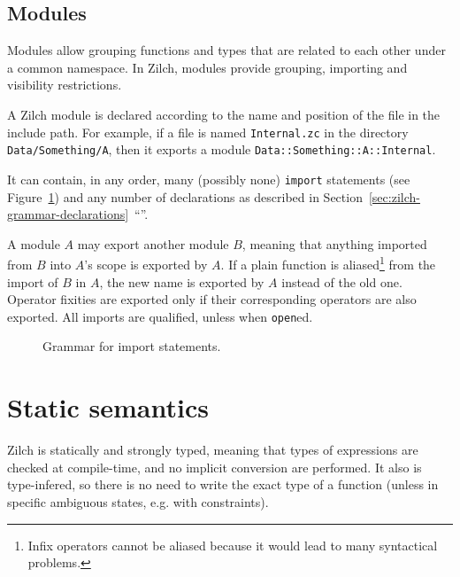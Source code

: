 \section{Modules}\label{sec:zilch-grammar-modules}

Modules allow grouping functions and types that are related to each other under a common namespace.
In Zilch, modules provide grouping, importing and visibility restrictions.

A Zilch module is declared according to the name and position of the file in the include path.
For example, if a file is named \verb|Internal.zc| in the directory \verb|Data/Something/A|, then it exports a module \verb|Data::Something::A::Internal|.

It can contain, in any order, many (possibly none) \texttt{import} statements (see Figure~\ref{fig:zilch-grammar-modules-importgrammar}) and any number of declarations as described in Section~\ref{sec:zilch-grammar-declarations}~``''.

A module $A$ may export another module $B$, meaning that anything imported from $B$ into $A$'s scope is exported by $A$.
If a plain function is aliased\footnote{Infix operators cannot be aliased because it would lead to many syntactical problems.} from the import of $B$ in $A$, the new name is exported by $A$ instead of the old one.
Operator fixities are exported only if their corresponding operators are also exported.
All imports are qualified, unless when \verb|open|ed.

\begin{figure}[H]
	\centering


	\caption{Grammar for import statements.}
	\label{fig:zilch-grammar-modules-importgrammar}
\end{figure}

\chapter{Static semantics}\label{chap:zilch-staticsem}

Zilch is statically and strongly typed, meaning that types of expressions are checked at compile-time, and no implicit conversion are performed.
It also is type-infered, so there is no need to write the exact type of a function (unless in specific ambiguous states, e.g. with constraints).


